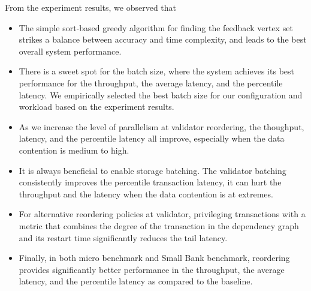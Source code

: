 From the experiment results, we observed that 
\begin{itemize}
\item The simple sort-based greedy algorithm for finding the feedback vertex set strikes a balance between accuracy and time complexity, and leads to the best overall system performance. 
\item There is a sweet spot for the batch size, where the system achieves its best performance for the throughput, the average latency, and the percentile latency. We empirically selected the best batch size for our configuration and workload based on the experiment results. 
\item As we increase the level of parallelism at validator reordering, the thoughput, latency, and the percentile latency all improve, especially when the data contention is medium to high.
\item It is always beneficial to enable storage batching. The validator batching consistently improves the percentile transaction latency, it can hurt the throughput and the latency when the data contention is at extremes.
\item For alternative reordering policies at validator, privileging transactions with a metric that combines the degree of the transaction in the dependency graph and its restart time significantly reduces the tail latency.
\item Finally, in both micro benchmark and Small Bank benchmark, reordering provides significantly better performance in the throughput, the average latency, and the percentile latency as compared to the baseline. 
\end{itemize}  